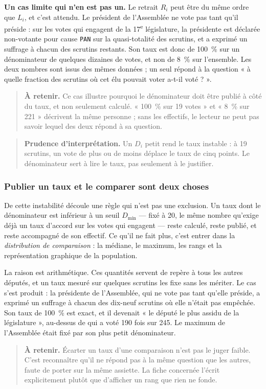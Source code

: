 \documentclass[11pt,a4paper]{article}
\newcommand{\code}[1]{\texttt{#1}}
\newcommand{\important}[1]{\begin{quote}\small\color{blue!55!black}\textbf{À retenir.} #1\end{quote}}
\newcommand{\prudence}[1]{\begin{quote}\small\color{red!55!black}\textbf{Prudence d'interprétation.} #1\end{quote}}
\begin{document}
\textbf{Un cas limite qui n'en est pas un.} Le retrait $R_i$ peut être du même
ordre que $L_i$, et c'est attendu. Le président de l'Assemblée ne vote pas tant
qu'il préside : sur les votes qui engagent de la 17\textsuperscript{e}
législature, la présidente est déclarée non-votante pour cause \code{PAN} sur la
quasi-totalité des scrutins, et a exprimé un suffrage à chacun des scrutins
restants. Son taux est donc de 100~\% sur un dénominateur de quelques dizaines
de votes, et non de 8~\% sur l'ensemble. Les deux nombres sont issus des mêmes
données ; un seul répond à la question « à quelle fraction des scrutins où cet
élu pouvait voter a-t-il voté ? ».

\important{Ce cas illustre pourquoi le dénominateur doit être publié à côté du
taux, et non seulement calculé. « 100~\% sur 19 votes » et « 8~\% sur 221 »
décrivent la même personne ; sans les effectifs, le lecteur ne peut pas savoir
lequel des deux répond à sa question.}

\prudence{Un $D_i$ petit rend le taux instable : à 19 scrutins, un vote de plus
ou de moins déplace le taux de cinq points. Le dénominateur sert à lire le taux,
pas seulement à le justifier.}

\subsubsection*{Publier un taux et le comparer sont deux choses}

De cette instabilité découle une règle qui n'est pas une exclusion. Un taux dont
le dénominateur est inférieur à un seuil $D_{\min}$ — fixé à 20, le même nombre
qu'exige déjà un taux d'accord sur les votes qui engagent — reste calculé,
reste publié, et reste accompagné de son effectif. Ce qu'il ne fait plus, c'est
entrer dans la \emph{distribution de comparaison} : la médiane, le maximum, les
rangs et la représentation graphique de la population.

La raison est arithmétique. Ces quantités servent de repère à tous les autres
députés, et un taux mesuré sur quelques scrutins les fixe sans les mériter. Le
cas s'est produit : la présidente de l'Assemblée, qui ne vote pas tant qu'elle
préside, a exprimé un suffrage à chacun des dix-neuf scrutins où elle n'était
pas empêchée. Son taux de 100~\% est exact, et il devenait « le député le plus
assidu de la législature », au-dessus de qui a voté 190 fois sur 245. Le maximum
de l'Assemblée était fixé par son plus petit dénominateur.

\important{Écarter un taux d'une comparaison n'est pas le juger faible. C'est
reconnaître qu'il ne répond pas à la même question que les autres, faute de
porter sur la même assiette. La fiche concernée l'écrit explicitement plutôt que
d'afficher un rang que rien ne fonde.}
\end{document}
